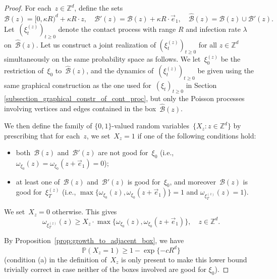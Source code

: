 \documentclass[a4paper,12pt]{article}
\newcommand{\Z}{\mathbb{Z}}
\begin{document}
\begin{proof}
For each~$z \in \Z^d$, define the sets
$$\mathscr{B}(z) = [0,\kappa R)^d + \kappa R\cdot z,\quad \mathscr{B}'(z) = \mathscr{B}(z) + \kappa R \cdot \vec{e}_1,\quad \widehat{\mathscr{B}}(z) = \mathscr{B}(z) \cup \mathscr{B}'(z).$$
Let~$(\xi^{(z)}_t)_{t \geq 0}$ denote the  contact process with range $R$ and infection rate $\lambda$ on~$\widehat{\mathscr{B}}(z)$. Let us construct a joint realization of $(\xi^{(z)}_t)_{t \geq 0}$ for all
$z \in \Z^d$ simultaneously on the same probability space as follows.
 We let~$\xi^{(z)}_0$ be the restriction of~$\xi_0$ to~$\widehat{\mathscr{B}}(z)$, and the dynamics of~$(\xi_t^{(z)})_{t \geq 0}$ be given using the same graphical construction  as the one used for~$(\xi_t)_{t \geq 0}$ in Section \ref{subsection_graphical_constr_of_cont_proc}, but only the Poisson processes involving vertices and edges contained in the box~$\widehat{\mathscr{B}}(z)$.

We then define the family of $\{0,1\}$-valued random variables~$\{X_z:z\in\Z^d\}$ by prescribing that for each~$z$, we set~$X_z = 1$ if one of the following conditions hold:
\begin{itemize}
\item[(a)] both~$\mathscr{B}(z)$ and~$\mathscr{B}'(z)$ are not good for~$\xi_0$ (i.e., $\omega_{\xi_0}(z)=\omega_{\xi_0}(z + \vec{e}_1)=0$);
\item[(b)] at least one of~$\mathscr{B}(z)$ and~$\mathscr{B}'(z)$ is good for~$\xi_0$, and moreover~$\mathscr{B}(z)$ is good for~$\xi^{(z)}_T$
(i.e., $\max\{\omega_{\xi_0}(z),\omega_{\xi_0}(z + \vec{e}_1) \}=1$ and $\omega_{\xi^{(z)}_T}(z)=1$).
\end{itemize}
We set~$X_z = 0$ otherwise. This gives
\begin{equation} \label{eq:compare_omega}\omega_{\xi^{(z)}_T}(z) \geq X_z \cdot \max\{\omega_{\xi_0}(z),\omega_{\xi_0}(z + \vec{e}_1) \},\quad z \in \Z^d.\end{equation}

 By Proposition~\ref{prop:growth_to_adjacent_box}, we have
\begin{equation*}
\mathbb{P}(X_z = 1) \geq 1 - \exp\{-cR^d \}
\end{equation*}
(condition (a) in the definition of~$X_z$ is only present to make this lower bound trivially correct in case neither of the boxes involved are good for $\xi_0$).


\end{proof}
\end{document}

